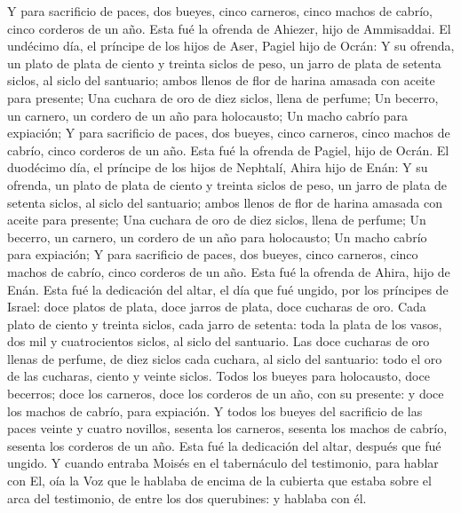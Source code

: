 Y para sacrificio de paces, dos bueyes, cinco carneros, cinco machos de
cabrío, cinco corderos de un año. Esta fué la ofrenda de Ahiezer, hijo
de Ammisaddai.  El undécimo día, el príncipe de los hijos
de Aser, Pagiel hijo de Ocrán:  Y su ofrenda, un plato de
plata de ciento y treinta siclos de peso, un jarro de plata de setenta
siclos, al siclo del santuario; ambos llenos de flor de harina amasada
con aceite para presente;  Una cuchara de oro de diez
siclos, llena de perfume;  Un becerro, un carnero, un
cordero de un año para holocausto;  Un macho cabrío para
expiación;  Y para sacrificio de paces, dos bueyes, cinco
carneros, cinco machos de cabrío, cinco corderos de un año. Esta fué la
ofrenda de Pagiel, hijo de Ocrán.  El duodécimo día, el
príncipe de los hijos de Nephtalí, Ahira hijo de Enán:  Y
su ofrenda, un plato de plata de ciento y treinta siclos de peso, un
jarro de plata de setenta siclos, al siclo del santuario; ambos llenos
de flor de harina amasada con aceite para presente;  Una
cuchara de oro de diez siclos, llena de perfume;  Un
becerro, un carnero, un cordero de un año para holocausto; 
Un macho cabrío para expiación;  Y para sacrificio de
paces, dos bueyes, cinco carneros, cinco machos de cabrío, cinco
corderos de un año. Esta fué la ofrenda de Ahira, hijo de Enán.
 Esta fué la dedicación del altar, el día que fué ungido,
por los príncipes de Israel: doce platos de plata, doce jarros de plata,
doce cucharas de oro.  Cada plato de ciento y treinta
siclos, cada jarro de setenta: toda la plata de los vasos, dos mil y
cuatrocientos siclos, al siclo del santuario.  Las doce
cucharas de oro llenas de perfume, de diez siclos cada cuchara, al siclo
del santuario: todo el oro de las cucharas, ciento y veinte siclos.
 Todos los bueyes para holocausto, doce becerros; doce los
carneros, doce los corderos de un año, con su presente: y doce los
machos de cabrío, para expiación.  Y todos los bueyes del
sacrificio de las paces veinte y cuatro novillos, sesenta los carneros,
sesenta los machos de cabrío, sesenta los corderos de un año. Esta fué
la dedicación del altar, después que fué ungido.  Y cuando
entraba Moisés en el tabernáculo del testimonio, para hablar con El, oía
la Voz que le hablaba de encima de la cubierta que estaba sobre el arca
del testimonio, de entre los dos querubines: y hablaba con él.

